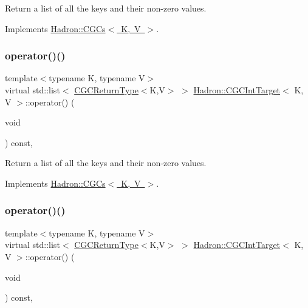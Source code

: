 Return a list of all the keys and their non-\/zero values. 



Implements \mbox{\hyperlink{classHadron_1_1CGCs_ac709374b31c0319e82028b9d7c23e993}{Hadron\+::\+C\+G\+Cs$<$ K, V $>$}}.

\mbox{\label{classHadron_1_1CGCIntTarget_ae6c0ce90fe1f8a2880984df1e2e44c18}} 
\subsubsection{\texorpdfstring{operator()()}{operator()()}\hspace{0.1cm}{\footnotesize\ttfamily [2/6]}}
{\footnotesize\ttfamily template$<$typename K, typename V$>$ \\
virtual std\+::list$<$ \mbox{\hyperlink{structHadron_1_1CGCReturnType}{C\+G\+C\+Return\+Type}}$<$K,V$>$ $>$ \mbox{\hyperlink{classHadron_1_1CGCIntTarget}{Hadron\+::\+C\+G\+C\+Int\+Target}}$<$ K, V $>$\+::operator() (\begin{DoxyParamCaption}\item[{void}]{ }\end{DoxyParamCaption}) const\hspace{0.3cm}{\ttfamily [inline]}, {\ttfamily [virtual]}}



Return a list of all the keys and their non-\/zero values. 



Implements \mbox{\hyperlink{classHadron_1_1CGCs_ac709374b31c0319e82028b9d7c23e993}{Hadron\+::\+C\+G\+Cs$<$ K, V $>$}}.

\mbox{\label{classHadron_1_1CGCIntTarget_ae6c0ce90fe1f8a2880984df1e2e44c18}} 
\subsubsection{\texorpdfstring{operator()()}{operator()()}\hspace{0.1cm}{\footnotesize\ttfamily [3/6]}}
{\footnotesize\ttfamily template$<$typename K, typename V$>$ \\
virtual std\+::list$<$ \mbox{\hyperlink{structHadron_1_1CGCReturnType}{C\+G\+C\+Return\+Type}}$<$K,V$>$ $>$ \mbox{\hyperlink{classHadron_1_1CGCIntTarget}{Hadron\+::\+C\+G\+C\+Int\+Target}}$<$ K, V $>$\+::operator() (\begin{DoxyParamCaption}\item[{void}]{ }\end{DoxyParamCaption}) const\hspace{0.3cm}{\ttfamily [inline]}, {\ttfamily [virtual]}}



